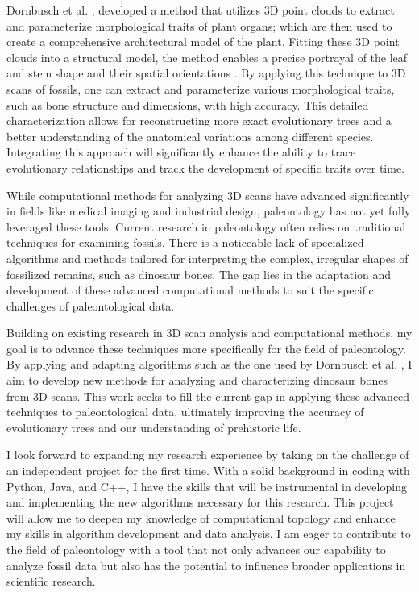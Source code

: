 \documentclass[12pt]{article}
\begin{document}
Dornbusch et al. \cite{dornbusch2007}, developed a method that utilizes 3D point 
clouds to extract and parameterize morphological traits of plant organs; which 
are then used to create a comprehensive architectural model of the plant. Fitting 
these 3D point clouds into a structural model, the method enables a precise 
portrayal of the leaf and stem shape and their spatial orientations \citep{dornbusch2007}. 
By applying this technique to 3D scans of fossils, one can extract and parameterize 
various morphological traits, such as bone structure and dimensions, with high 
accuracy. This detailed characterization allows for reconstructing more exact
evolutionary trees and a better understanding of the anatomical variations among
different species. Integrating this approach will significantly enhance the
ability to trace evolutionary relationships and track the development of
specific traits over time. 

While computational methods for analyzing 3D scans have advanced significantly
in fields like medical imaging and industrial design, paleontology has not yet
fully leveraged these tools. Current research in paleontology often relies on
traditional techniques for examining fossils. There is a noticeable lack of
specialized algorithms and methods tailored for interpreting the complex,
irregular shapes of fossilized remains, such as dinosaur bones. The gap lies in
the adaptation and development of these advanced computational methods to suit
the specific challenges of paleontological data.

Building on existing research in 3D scan analysis and computational methods, my
goal is to advance these techniques more specifically for the field of
paleontology. By applying and adapting algorithms such as the one used by
Dornbusch et al. \citep{dornbusch2007}, I aim to develop new methods for analyzing 
and characterizing dinosaur bones from 3D scans. This work seeks to fill the 
current gap in applying these advanced techniques to paleontological data, 
ultimately improving the accuracy of evolutionary trees and our understanding of 
prehistoric life.

I look forward to expanding my research experience by taking on the challenge of
an independent project for the first time. With a solid background in
coding with Python, Java, and C++, I have the skills that will be instrumental 
in developing and implementing the new algorithms necessary for this research. 
This project will allow me to deepen my knowledge of computational topology and 
enhance my skills in algorithm development and data analysis. I am eager to 
contribute to the field of paleontology with a tool that not only advances our 
capability to analyze fossil data but also has the potential to influence broader 
applications in scientific research.
\end{document}
